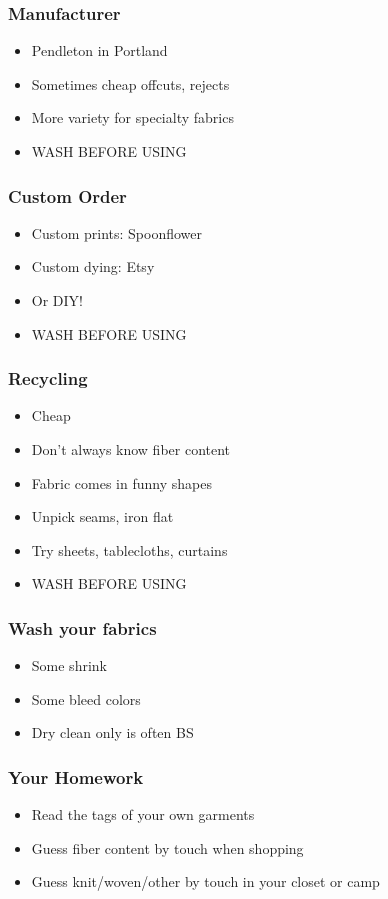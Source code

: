\documentclass{beamer}
\begin{document}
\begin{frame}[fragile]
\frametitle{Manufacturer}
\begin{itemize}
\item Pendleton in Portland
\item Sometimes cheap offcuts, rejects
\item More variety for specialty fabrics
\item WASH BEFORE USING
\end{itemize}
\end{frame}

\begin{frame}[fragile]
\frametitle{Custom Order}
\begin{itemize}
\item Custom prints: Spoonflower
\item Custom dying: Etsy
\item Or DIY!
\item WASH BEFORE USING
\end{itemize}
\end{frame}

\begin{frame}[fragile]
\frametitle{Recycling}
\begin{itemize}
\item Cheap
\item Don't always know fiber content
\item Fabric comes in funny shapes
\item Unpick seams, iron flat
\item Try sheets, tablecloths, curtains
\item WASH BEFORE USING
\end{itemize}
\end{frame}

\begin{frame}[fragile]
\frametitle{Wash your fabrics}
\begin{itemize}
\item Some shrink
\item Some bleed colors
\item Dry clean only is often BS
\end{itemize}
\end{frame}


\begin{frame}[fragile]
\frametitle{Your Homework}
\begin{itemize}
\item Read the tags of your own garments
\item Guess fiber content by touch when shopping
\item Guess knit/woven/other by touch in your closet or camp
\end{itemize}
\end{frame}
\end{document}
